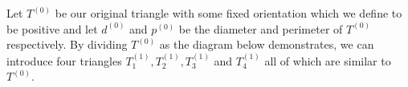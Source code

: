 \documentclass[
]{article}
\theoremstyle{definition}
\theoremstyle{definition}
\begin{document}
\proof

Let \(T^{(0)}\) be our original triangle with some fixed orientation
which we define to be positive and let \(d^{(0)}\) and \(p^{(0)}\) be
the diameter and perimeter of \(T^{(0)}\) respectively. By dividing
\(T^{(0)}\) as the diagram below demonstrates, we can introduce four
triangles \(T_1^{(1)}, T_2^{(1)}, T_3^{(1)}\) and \(T_4^{(1)}\) all of
which are similar to \(T^{(0)}\).

\begin{center}

\begin{tikzpicture}[x=0.75pt,y=0.75pt,yscale=-1,xscale=1]


\end{tikzpicture}
\end{center}
\end{document}

